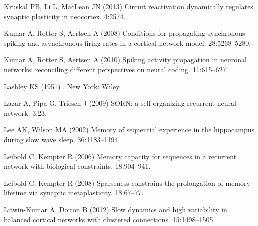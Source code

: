 \begin{thebibliography}{}

Kruskal PB, Li L, MacLean JN (2013{\rm{}})
\newblock Circuit reactivation dynamically regulates synaptic plasticity in
  neocortex.
 4:2574.

Kumar A, Rotter S, Aertsen A (2008{\rm{}})
\newblock Conditions for propagating synchronous spiking and asynchronous
  firing rates in a cortical network model.
 28:5268--5280.

Kumar A, Rotter S, Aertsen A (2010{\rm{}})
\newblock Spiking activity propagation in neuronal networks: reconciling different perspectives on neural coding.
 11:615--627.

Lashley KS (1951{\rm{}})
.
\newblock New York: Wiley.

Lazar A, Pipa G, Triesch J (2009{\rm{}})
\newblock SORN: a self-organizing recurrent neural network.
 3:23.

Lee AK, Wilson MA (2002{\rm{}})
\newblock Memory of sequential experience in the hippocampus during slow wave
  sleep.
 36:1183--1194.

Leibold C, Kempter R (2006{\rm{}})
\newblock Memory capacity for sequences in a recurrent network with biological constraints.
 18:904--941.

Leibold C, Kempter R (2008{\rm{}})
\newblock Sparseness constrains the prolongation of memory lifetime via synaptic metaplasticity.
 18:67--77.

Litwin-Kumar A, Doiron B (2012{\rm{}})
\newblock Slow dynamics and high variability in balanced cortical networks with clustered connections.
 15:1498--1505.


\end{thebibliography}
